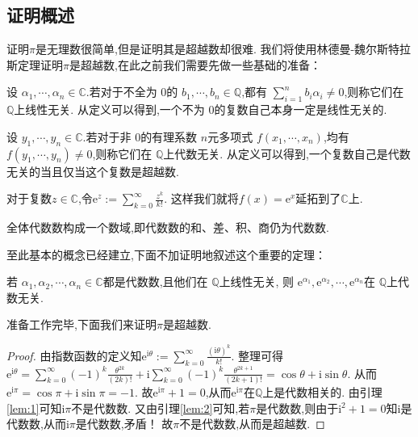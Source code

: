 \documentclass[main]{subfiles}
\begin{document}
\subsection{证明概述}
证明\(\pi\)是无理数很简单,但是证明其是超越数却很难.
我们将使用林德曼-魏尔斯特拉斯定理证明\(\pi\)是超越数,在此之前我们需要先做一些基础的准备：
\begin{definition}\label{def:2}
	设 \(\alpha_1,\cdots,\alpha_n \in \mathbb{C}\).若对于不全为 \(0\)的 \(b_1,\cdots,b_n \in \mathbb{Q}\),都有 \(\sum_{i=1}^{n} b_i \alpha_i \neq 0\),则称它们在 \(\mathbb{Q}\)上线性无关.
	从定义可以得到,一个不为 \(0\)的复数自己本身一定是线性无关的.

	设 \(y_1,\cdots,y_n \in \mathbb{C}\).若对于非 \(0\)的有理系数 \(n\)元多项式 \(f(x_1,\cdots,x_n)\),均有 \(f(y_1,\cdots,y_n) \neq 0\),则称它们在 \(\mathbb{Q}\)上代数无关.
	从定义可以得到,一个复数自己是代数无关的当且仅当这个复数是超越数.
\end{definition}
\begin{definition}\label{def:3}
	对于复数\(z \in \mathbb{C}\),令\(\mathrm{e}^z:=\sum_{k=0}^{\infty}\frac{z^k}{k!}\).
	这样我们就将\(f(x)=\mathrm{e}^x\)延拓到了\(\mathbb{C}\)上.
\end{definition}
\begin{lemma}\label{lem:2}
	全体代数数构成一个数域,即代数数的和、差、积、商仍为代数数.
\end{lemma}
至此基本的概念已经建立,下面不加证明地叙述这个重要的定理：
\begin{lemma}\label{lem:1}
	若 \(\alpha_1,\alpha_2,\cdots,\alpha_n \in \mathbb{C}\)都是代数数,且他们在 \(\mathbb{Q}\)上线性无关,
	则 \(\mathrm{e}^{\alpha_1},\mathrm{e}^{\alpha_2},\cdots,\mathrm{e}^{\alpha_n}\)在 \(\mathbb{Q}\)上代数无关.
\end{lemma}
准备工作完毕,下面我们来证明\(\pi\)是超越数.
\begin{proof}
	由指数函数的定义知\(\mathrm{e}^{\mathrm{i}\theta}:=\sum_{k=0}^{\infty}\frac{(\mathrm{i}\theta)^k}{k!}\).
	整理可得\(\mathrm{e}^{\mathrm{i}\theta}=\sum_{k=0}^{\infty}(-1)^k\frac{\theta^{2k}}{(2k)!}+\mathrm{i}\sum_{k=0}^{\infty}(-1)^k\frac{\theta^{2k +1}}{(2k +1)!}=\cos \theta + \mathrm{i} \sin \theta\).
	从而\(\mathrm{e}^{\mathrm{i}\pi}=\cos \pi + \mathrm{i}\sin \pi=-1\).
	故\(\mathrm{e}^{\mathrm{i}\pi}+1=0\),从而\(\mathrm{e}^{\mathrm{i}\pi}\)在\(\mathbb{Q}\)上是代数相关的.
	由引理\ref{lem:1}可知\(\mathrm{i}\pi\)不是代数数.
	又由引理\ref{lem:2}可知,若\(\pi\)是代数数,则由于\(\mathrm{i}^2+1=0\)知\(\mathrm{i}\)是代数数,从而\(\mathrm{i}\pi\)是代数数,矛盾！
	故\(\pi\)不是代数数,从而是超越数.
\end{proof}
\end{document}
